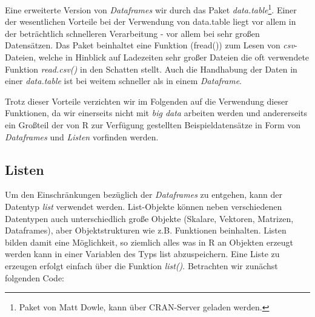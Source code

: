 \documentclass[]{article}
\let\rmarkdownfootnote\footnote%
\def\footnote{\protect\rmarkdownfootnote}
\begin{document}
Eine erweiterte Version von \emph{Dataframes} wir durch das Paket
\emph{data.table}\footnote{Paket von Matt Dowle, kann über CRAN-Server
  geladen werden.}. Einer der wesentlichen Vorteile bei der Verwendung
von data.table liegt vor allem in der beträchtlich schnelleren
Verarbeitung - vor allem bei sehr großen Datensätzen. Das Paket
beinhaltet eine Funktion (fread()) zum Lesen von \emph{csv}-Dateien,
welche in Hinblick auf Ladezeiten sehr großer Dateien die oft verwendete
Funktion \emph{read.csv()} in den Schatten stellt. Auch die Handhabung
der Daten in einer \emph{data.table} ist bei weitem schneller als in
einem \emph{Dataframe}.

Trotz dieser Vorteile verzichten wir im Folgenden auf die Verwendung
dieser Funktionen, da wir einerseits nicht mit \emph{big data} arbeiten
werden und andererseits ein Großteil der von R zur Verfügung gestellten
Beispieldatensätze in Form von \emph{Dataframes} und \emph{Listen}
vorfinden werden.

\subsection*{Listen}\label{listen}

Um den Einschränkungen bezüglich der \emph{Dataframes} zu entgehen, kann
der Datentyp \emph{list} verwendet werden. List-Objekte können neben
verschiedenen Datentypen auch unterschiedlich große Objekte (Skalare,
Vektoren, Matrizen, Dataframes), aber Objektstrukturen wie z.B.
Funktionen beinhalten. Listen bilden damit eine Möglichkeit, so ziemlich
alles was in R an Objekten erzeugt werden kann in einer Variablen des
Typs list abzuspeichern. Eine Liste zu erzeugen erfolgt einfach über die
Funktion \emph{list()}. Betrachten wir zunächst folgenden Code:
\end{document}
